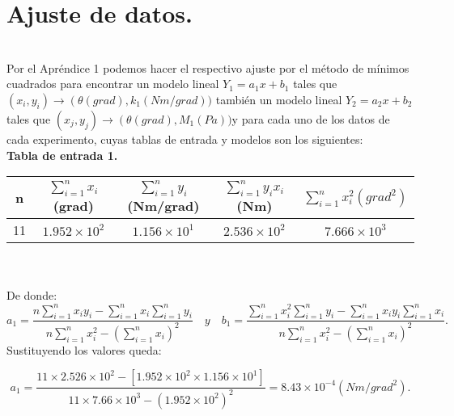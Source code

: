 \documentclass[10pt,a4paper]{article}
\begin{document}
\section*{Ajuste de datos.}\\
Por el Apr\'{e}ndice 1 podemos hacer el respectivo ajuste por el m\'{e}todo de m\'{i}nimos cuadrados para encontrar un modelo lineal ${Y}_{1}={a}_{1}x +{b}_{1}$ tales que $\left( { x }_{ i },{ y }_{ i } \right) \rightarrow \left( \theta(grad),{k}_{1} (Nm/grad))$  tambi\'{e}n un modelo lineal ${Y}_{2}={a}_{2}x +{b}_{2}$ tales que $\left( { x }_{ j },{ y }_{ j } \right) \rightarrow \left( \theta(grad), {M}_{1}(Pa))$y para cada uno de los datos de cada experimento, cuyas tablas de entrada y modelos son los siguientes:
\medskip
\\
\textbf{Tabla de entrada 1.}
\\
\begin{figure 6}
\centering
\begin{tabular}{|c|c|c|c|c|}
\hline 
n&$\sum _{ i=1 }^{ n }{ { x }_{ i } } $(grad) & $\sum _{ i=1 }^{ n }{ { y }_{ i } }$(Nm/grad) & $ \sum _{ i=1 }^{ n }{ { y }_{ i } } { x }_{ i }$ (Nm) & $\sum _{ i=1 }^{ n }{ { x }_{ i }^{ 2 } }({ grad }^{ 2 })$ \\ 

\hline 
11&$1.952\times { 10 }^{ 2 }$& $1.156\times { 10 }^{ 1 }$ & $2.536\times { 10 }^{ 2 }$ & $7.666\times { 10 }^{ 3 }$\\ 
\hline 
\end{tabular}
\end{figure 6} 
\\
\\
De donde:
\[{a}_{1}=\frac { n\sum _{ i=1 }^{ n }{ { x }_{ i }{ y }_{ i } } -\sum _{ i=1 }^{ n }{ { x }_{ i } } \sum _{ i=1 }^{ n }{ { y }_{ i } }  }{ n\sum _{ i=1 }^{ n }{ { x }_{ i }^{ 2 } } -{ \left( \sum _{ i=1 }^{ n }{ { x }_{ i } }  \right)  }^{ 2 } } \quad y\quad {b}_{1}=\frac { \sum _{ i=1 }^{ n }{ { x }_{ i }^{ 2 } } \sum _{ i=1 }^{ n }{ { y }_{ i } } -\sum _{ i=1 }^{ n }{ { x }_{ i }{ y }_{ i } } \sum _{ i=1 }^{ n }{ { x }_{ i } }  }{ n\sum _{ i=1 }^{ n }{ { x }_{ i }^{ 2 } } -{ \left( \sum _{ i=1 }^{ n }{ { x }_{ i } }  \right)  }^{ 2 } }.\]
Sustituyendo los valores queda:

\[{a}_{1}=\frac { 11\times 2.526\times { 10 }^{ 2 }-\left[ 1.952\times { 10 }^{ 2 }\times 1.156\times { 10 }^{ 1 } \right]  }{ 11\times 7.66\times { 10 }^{ 3 }-{ \left( 1.952\times { 10 }^{ 2 }\right)  }^{ 2 } } ={ 8.43\times 10 }^{ -4 } (Nm/{grad}^{ 2 }).\]
\end{document}
